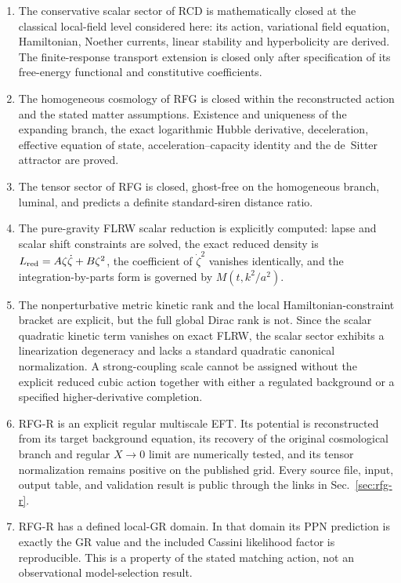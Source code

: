 \documentclass[11pt,a4paper]{article}
\begin{document}
\begin{enumerate}
\item The conservative scalar sector of RCD is mathematically closed at the classical local-field level considered here: its action, variational field equation, Hamiltonian, Noether currents, linear stability and hyperbolicity are derived. The finite-response transport extension is closed only after specification of its free-energy functional and constitutive coefficients.
\item The homogeneous cosmology of RFG is closed within the reconstructed action and the stated matter assumptions. Existence and uniqueness of the expanding branch, the exact logarithmic Hubble derivative, deceleration, effective equation of state, acceleration--capacity identity and the de~Sitter attractor are proved.
\item The tensor sector of RFG is closed, ghost-free on the homogeneous branch, luminal, and predicts a definite standard-siren distance ratio.
\item The pure-gravity FLRW scalar reduction is explicitly computed: lapse and scalar shift constraints are solved, the exact reduced density is \(L_{\rm red}=A\zeta\dot\zeta+B\zeta^2\), the coefficient of \(\dot\zeta^2\) vanishes identically, and the integration-by-parts form is governed by \(M(t,k^2/a^2)\).
\item The nonperturbative metric kinetic rank and the local Hamiltonian-constraint bracket are explicit, but the full global Dirac rank is not. Since the scalar quadratic kinetic term vanishes on exact FLRW, the scalar sector exhibits a linearization degeneracy and lacks a standard quadratic canonical normalization. A strong-coupling scale cannot be assigned without the explicit reduced cubic action together with either a regulated background or a specified higher-derivative completion.
\item RFG-R is an explicit regular multiscale EFT. Its potential is reconstructed from its target background equation, its recovery of the original cosmological branch and regular \(X\to0\) limit are numerically tested, and its tensor normalization remains positive on the published grid. Every source file, input, output table, and validation result is public through the links in Sec.~\ref{sec:rfg-r}.
\item RFG-R has a defined local-GR domain. In that domain its PPN prediction is exactly the GR value and the included Cassini likelihood factor is reproducible. This is a property of the stated matching action, not an observational model-selection result.

\end{enumerate}
\end{document}

